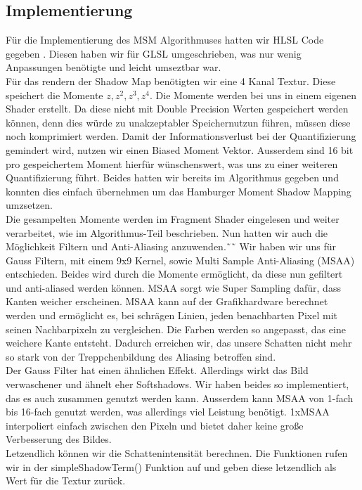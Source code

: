 \documentclass[runningheaders,a4paper]{llncs}
\begin{document}
\subsection{Implementierung}
Für die Implementierung des MSM Algorithmuses hatten wir HLSL Code gegeben \cite{msm}.
Diesen haben wir für GLSL umgeschrieben, was nur wenig Anpassungen benötigte und leicht umseztbar war.\\
Für das rendern der Shadow Map benötigten wir eine 4 Kanal Textur. Diese speichert die Momente $z,z^2,z^3,z^4$. Die Momente werden bei uns in einem eigenen Shader erstellt. Da diese nicht mit Double Precision Werten gespeichert werden können, denn dies würde zu unakzeptabler Speichernutzun führen, müssen diese noch komprimiert werden. Damit der Informationsverlust bei der Quantifizierung gemindert wird, nutzen wir einen Biased Moment Vektor. Ausserdem sind 16 bit pro gespeichertem Moment hierfür wünschenswert, was uns zu einer weiteren Quantifizierung führt. Beides hatten wir bereits im Algorithmus gegeben und konnten dies einfach übernehmen um das Hamburger Moment Shadow Mapping umzsetzen.\\
Die gesampelten Momente werden im Fragment Shader eingelesen und weiter verarbeitet, wie im Algorithmus-Teil beschrieben. Nun hatten wir auch die Möglichkeit Filtern und Anti-Aliasing anzuwenden.˜˜
Wir haben wir uns für Gauss Filtern, mit einem 9x9 Kernel, sowie Multi Sample Anti-Aliasing (MSAA) entschieden. Beides wird durch die Momente ermöglicht, da diese nun gefiltert und anti-aliased werden können. MSAA sorgt wie Super Sampling dafür, dass Kanten weicher erscheinen. MSAA kann auf der Grafikhardware berechnet werden und ermöglicht es, bei schrägen Linien, jeden benachbarten Pixel mit seinen Nachbarpixeln zu vergleichen. Die Farben werden so angepasst, das eine weichere Kante entsteht. Dadurch erreichen wir, das unsere Schatten nicht mehr so stark von der Treppchenbildung des Aliasing betroffen sind. \\Der Gauss Filter hat einen ähnlichen Effekt. Allerdings wirkt das Bild verwaschener und ähnelt eher Softshadows. Wir haben beides so implementiert, das es auch zusammen genutzt werden kann. Ausserdem kann MSAA von 1-fach bis 16-fach genutzt werden, was allerdings viel Leistung benötigt. 1xMSAA interpoliert einfach zwischen den Pixeln und bietet daher keine große Verbesserung des Bildes.\\
Letzendlich können wir die Schattenintensität berechnen.
Die Funktionen rufen wir in der simpleShadowTerm() Funktion auf und geben diese letzendlich als Wert für die Textur zurück.
\end{document}
